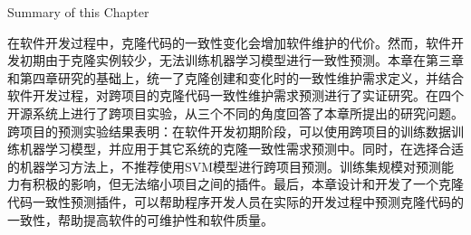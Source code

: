 
{Summary of this Chapter}

在软件开发过程中，克隆代码的一致性变化会增加软件维护的代价。然而，软件开发初期由于克隆实例较少，无法训练机器学习模型进行一致性预测。本章在第三章和第四章研究的基础上，统一了克隆创建和变化时的一致性维护需求定义，并结合软件开发过程，对跨项目的克隆代码一致性维护需求预测进行了实证研究。在四个开源系统上进行了跨项目实验，从三个不同的角度回答了本章所提出的研究问题。跨项目的预测实验结果表明：在软件开发初期阶段，可以使用跨项目的训练数据训练机器学习模型，并应用于其它系统的克隆一致性需求预测中。同时，在选择合适的机器学习方法上，不推荐使用SVM模型进行跨项目预测。训练集规模对预测能力有积极的影响，但无法缩小项目之间的插件。最后，本章设计和开发了一个克隆代码一致性预测插件，可以帮助程序开发人员在实际的开发过程中预测克隆代码的一致性，帮助提高软件的可维护性和软件质量。

